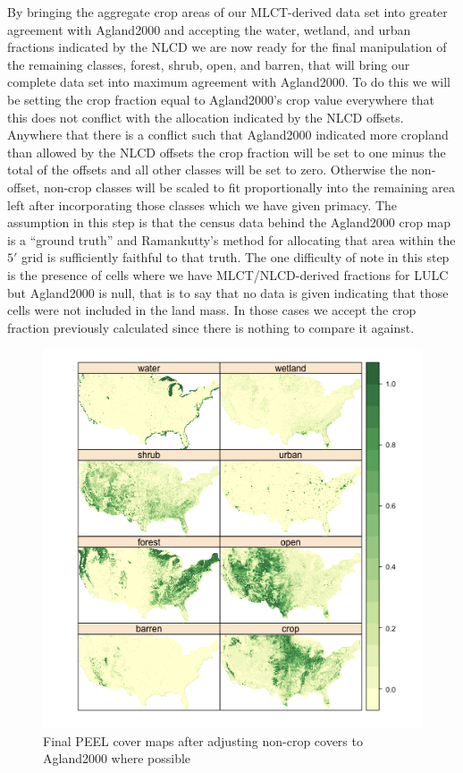 By bringing the aggregate crop areas of our MLCT-derived data set into
greater agreement with Agland2000 and accepting the water, wetland,
and urban fractions indicated by the NLCD we are now ready for the
final manipulation of the remaining classes, forest, shrub, open, and
barren, that will bring our complete data set into maximum agreement
with Agland2000.  To do this we will be setting the crop fraction
equal to Agland2000's crop value everywhere that this does not
conflict with the allocation indicated by the NLCD offsets.  Anywhere
that there is a conflict such that Agland2000 indicated more cropland
than allowed by the NLCD offsets the crop fraction will be set to one
minus the total of the offsets and all other classes will be set to
zero.  Otherwise the non-offset, non-crop classes will be scaled to
fit proportionally into the remaining area left after incorporating
those classes which we have given primacy.  The assumption in this step
is that the census data behind the Agland2000 crop map is a ``ground
truth'' and Ramankutty's method for allocating that area within the
$5'$ grid is sufficiently faithful to that truth.  The one difficulty
of note in this step is the presence of cells where we have
MLCT/NLCD-derived fractions for LULC but Agland2000 is null, that is
to say that no data is given indicating that those cells were not
included in the land mass.  In those cases we accept the crop fraction
previously calculated since there is nothing to compare it against.


\begin{figure}[ht] 
  \centering


\includegraphics{fig_agc}
\caption{Final PEEL cover maps after adjusting non-crop covers to Agland2000 where possible} 
\label{fig:agc} 
\end{figure} 

